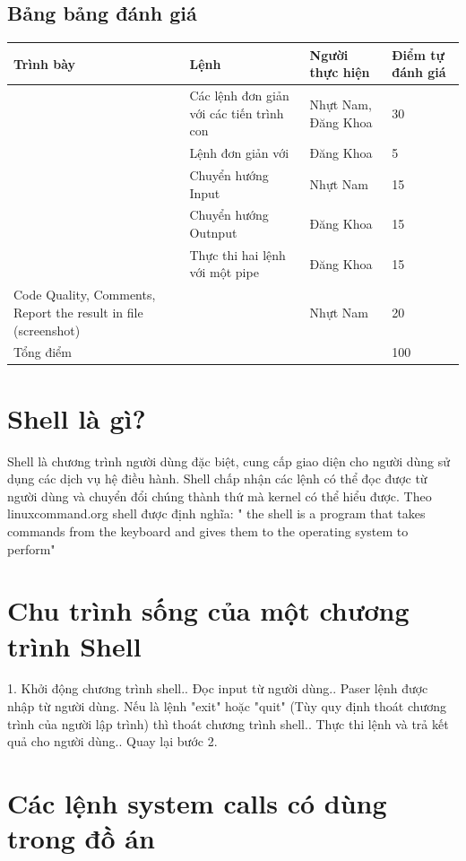 \documentclass{article}
\newcommand{\ra}[1]{\renewcommand{\arraystretch}{#1}}
\begin{document}
\subsection{Bảng bảng đánh giá}
\begin{table}[h]\centering
\ra{1.3}
\begin{tabular}{p{3cm}p{4cm}p{3cm}l}\toprule
\textbf{Trình bày} & \textbf{Lệnh} & \textbf{Người thực hiện} &\textbf{Điểm tự đánh giá} \tabularnewline
\midrule
& Các lệnh đơn giản với các tiến trình con & Nhựt Nam, Đăng Khoa & 30 \tabularnewline
& Lệnh đơn giản với  & Đăng Khoa & 5  \tabularnewline
& Chuyển hướng Input & Nhựt Nam & 15  \tabularnewline
& Chuyển hướng Outnput & Đăng Khoa & 15 \tabularnewline
& Thực thi hai lệnh với một pipe & Đăng Khoa & 15 \tabularnewline
Code Quality, Comments, Report the result in file (screenshot) & & Nhựt Nam & 20  \tabularnewline
Tổng điểm & & & 100  \tabularnewline
\bottomrule
\end{tabular}
\end{table}

\section{Shell là gì?}

Shell là chương trình người dùng đặc biệt, cung cấp giao diện cho người dùng sử dụng các dịch vụ hệ điều hành. Shell chấp nhận các lệnh có thể đọc được từ người dùng và chuyển đổi chúng thành thứ mà kernel có thể hiểu được.\newline
Theo linuxcommand.org shell được định nghĩa: " the shell is a program that takes commands from the keyboard and gives them to the operating system to perform"\newline

\section{Chu trình sống của một chương trình Shell}
1. Khởi động chương trình shell.. Đọc input từ người dùng.. Paser lệnh được nhập từ người dùng. Nếu là lệnh "exit" hoặc "quit" (Tùy quy định thoát chương trình của người lập trình) thì thoát chương trình shell.. Thực thi lệnh và trả kết quả cho người dùng.. Quay lại bước 2.

\section{Các lệnh system calls có dùng trong đồ án}
\end{document}
